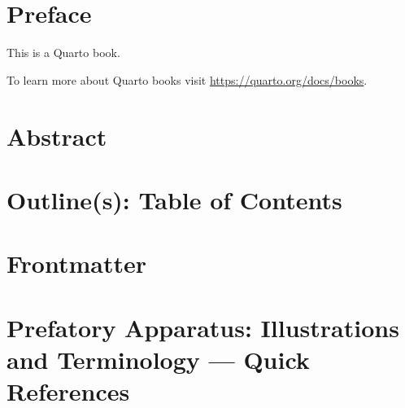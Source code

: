 \documentclass[12pt,a4paper]{report}      %
\begin{document}



\chapter*{Preface}\label{preface}


This is a Quarto book.

To learn more about Quarto books visit
\url{https://quarto.org/docs/books}.


\chapter*{Abstract}\label{abstract}



\chapter*{Outline(s): Table of
Contents}\label{outlines-table-of-contents}



\chapter*{Frontmatter}\label{frontmatter}



\chapter*{Prefatory Apparatus: Illustrations and Terminology --- Quick
References}\label{prefatory-apparatus-illustrations-and-terminology-quick-references}
\end{document}
